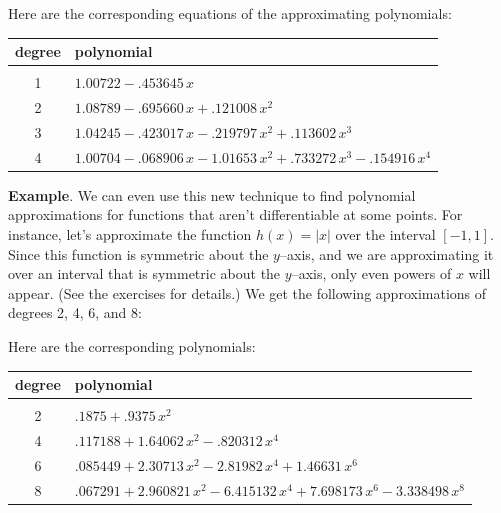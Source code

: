 {{{{\vspace*{3in}

Here are the corresponding equations of the approximating polynomials:

\medskip
\begin{tabular}{cl}
degree & \hspace{1in} polynomial \\ \hline
& \\ [-5pt] 
1 & $1.00722 - .453645\,x $ \\ [.15in]
2& $1.08789 -.695660\,x +.121008\,x^2 $\\ [.15in]
3 & $1.04245 -.423017\,x-.219797\,x^2+.113602\,x^3$ \\ [.15in]
4 & $1.00704 -.068906\,x-1.01653\,x^2+.733272\,x^3-.154916\,x^4$\\
\end{tabular}

\medskip



{\bf Example}.  We can even use this new technique to find 
polynomial approximations for functions that aren't differentiable at some points.  For instance, let's approximate the function $h(x) = |x|$ over the interval $[-1,1]$.  Since this function is symmetric about the $y$--axis, and we are approximating it over an interval that is symmetric about the $y$--axis, only even powers of $x$ will appear.  (See the exercises for details.)  We get the following approximations of degrees 2, 4, 6, and 8:

\vspace*{3.25in}

\medskip
Here are the corresponding polynomials:

\medskip
\begin{tabular}{cl}
degree & \hspace{1in} polynomial \\ \hline
& \\ [-5pt]
2 & $.1875 +.9375\,x^2 $ \\ [.15in]
4& $.117188 +1.64062\,x^2 -.820312\,x^4 $\\ [.15in]
6 & $.085449 +2.30713\,x^2-2.81982\,x^4+1.46631\,x^6$ \\ [.15in]
8 & $.067291 +2.960821\,x^2-6.415132\,x^4+7.698173\,x^6-3.338498\,x^8$\\
\end{tabular}

}}}}
